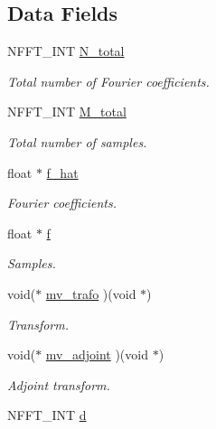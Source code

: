 \subsection*{Data Fields}
\begin{DoxyCompactItemize}
\item 
N\-F\-F\-T\-\_\-\-I\-N\-T \hyperlink{structnfctf__plan_ae8dd214d11d406cebe94d9e925605609}{N\-\_\-total}
\begin{DoxyCompactList}\small\item\em Total number of Fourier coefficients. \end{DoxyCompactList}\item 
N\-F\-F\-T\-\_\-\-I\-N\-T \hyperlink{structnfctf__plan_aa552f98df30e890a58ac4899cfa172ee}{M\-\_\-total}
\begin{DoxyCompactList}\small\item\em Total number of samples. \end{DoxyCompactList}\item 
float $\ast$ \hyperlink{structnfctf__plan_a33bae90d163b1d848efc2c656bac6839}{f\-\_\-hat}
\begin{DoxyCompactList}\small\item\em Fourier coefficients. \end{DoxyCompactList}\item 
float $\ast$ \hyperlink{structnfctf__plan_a5c695490725fbd63787fb76548de2908}{f}
\begin{DoxyCompactList}\small\item\em Samples. \end{DoxyCompactList}\item 
void($\ast$ \hyperlink{structnfctf__plan_a7a532e28539e1ac2f49413248ae76a67}{mv\-\_\-trafo} )(void $\ast$)
\begin{DoxyCompactList}\small\item\em Transform. \end{DoxyCompactList}\item 
void($\ast$ \hyperlink{structnfctf__plan_a876dda7208fd0634f426c1e5cb04b77f}{mv\-\_\-adjoint} )(void $\ast$)
\begin{DoxyCompactList}\small\item\em Adjoint transform. \end{DoxyCompactList}\item 
\hypertarget{structnfctf__plan_a56ab292d5ea382c4e5275583022b024b}{N\-F\-F\-T\-\_\-\-I\-N\-T \hyperlink{structnfctf__plan_a56ab292d5ea382c4e5275583022b024b}{d}}\label{structnfctf__plan_a56ab292d5ea382c4e5275583022b024b}


\end{DoxyCompactItemize}
